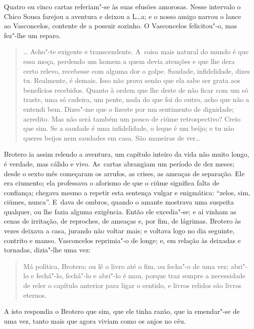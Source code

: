 \begin{linenumbers}
Quatro ou cinco cartas referiam"-se às suas efusões amorosas. Nesse
intervalo o Chico Sousa farejou a aventura e deixou a L\ldots{}a; e o nosso
amigo narrou o lance ao Vasconcelos, contente de a possuir sozinho. O
Vasconcelos felicitou"-o, mas fez"-lhe um reparo.

\begin{quote}
\ldots{} Acho"-te exigente e transcendente. A~coisa mais natural do mundo é
que essa moça, perdendo um homem a quem devia atenções e que lhe dera
certo relevo, recebesse com alguma dor o golpe. Saudade, infidelidade,
dizes tu. Realmente, é demais. Isso não prova senão que ela sabe ser
grata aos benefícios recebidos. Quanto à ordem que lhe deste de não
ficar com um só traste, uma só cadeira, um pente, nada do que foi do
outro, acho que não a entendi bem. Dizes"-me que o fizeste por um
sentimento de dignidade; acredito. Mas não será também um pouco de ciúme
retrospectivo? Creio que sim. Se a saudade é uma infidelidade, o leque é
um beijo; e tu não queres beijos nem saudades em casa. São maneiras de
ver\ldots{}
\end{quote}

Brotero ia assim relendo a aventura, um capítulo inteiro da vida não
muito longo, é verdade, mas cálido e vivo. As~cartas abrangiam um
período de dez meses; desde o sexto mês começaram os arrufos, as crises,
as ameaças de separação. Ele era ciumento; ela professava o aforismo de
que o ciúme significa falta de confiança; chegava mesmo a repetir esta
sentença vulgar e enigmática: ``zelos, sim, ciúmes, nunca''. E~dava de
ombros, quando o amante mostrava uma suspeita qualquer, ou lhe fazia
alguma exigência. Então ele excedia"-se; e aí vinham as cenas de
irritação, de reproches, de ameaças e, por fim, de lágrimas. Brotero às
vezes deixava a casa, jurando não voltar mais; e voltava logo no dia
seguinte, contrito e manso. Vasconcelos reprimia"-o de longe; e, em
relação às deixadas e tornadas, dizia"-lhe uma vez:

\begin{quote}
Má política, Brotero; ou lê o livro até o fim, ou fecha"-o de uma vez;
abri"-lo e fechá"-lo, fechá"-lo e abri"-lo é mau, porque traz sempre a
necessidade de reler o capítulo anterior para ligar o sentido, e livros
relidos são livros eternos.
\end{quote}

A isto respondia o Brotero que sim, que ele tinha razão, que ia
emendar"-se de uma vez, tanto mais que agora viviam como os anjos no céu.


\end{linenumbers}
